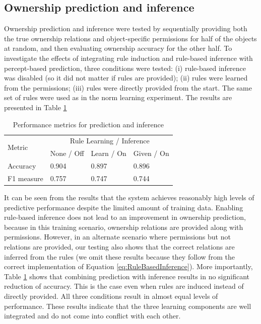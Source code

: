 \documentclass[letterpaper]{article} %
\begin{document}
\subsection{Ownership prediction and inference}

Ownership prediction and inference were tested by sequentially providing both the true ownership relations and object-specific permissions for half of the objects at random, and then evaluating ownership accuracy for the other half. To investigate the effects of integrating rule induction and rule-based inference with percept-based prediction, three conditions were tested: (i) rule-based inference was disabled (so it did not matter if rules are provided); (ii) rules were learned from the permissions; (iii) rules were directly provided from the start. The same set of rules were used as in the norm learning experiment. The results are presented in Table \ref{tab:OwnershipPrediction}

\begin{table}[ht]
\centering
\begin{tabular}{@{}llll@{}}
\toprule
\multirow{2}{*}{Metric} & \multicolumn{3}{c}{Rule Learning / Inference} \\ \cmidrule(l){2-4}
                        & None / Off  & Learn / On & Given / On \\ \midrule
Accuracy                & 0.904       & 0.897      & 0.896      \\
F1 measure              & 0.757       & 0.747      & 0.744      \\ \bottomrule
\end{tabular}
\caption{Performance metrics for prediction and inference}
\label{tab:OwnershipPrediction}
\end{table}

It can be seen from the results that the system achieves reasonably high levels of predictive performance despite the limited amount of training data. Enabling rule-based inference does not lead to an improvement in ownership prediction, because in this training scenario, ownership relations are provided along with permissions. However, in an alternate scenario where permissions but not relations are provided, our testing also shows that the correct relations are inferred from the rules (we omit these results because they follow from the correct implementation of Equation \ref{eq:RuleBasedInference}). More importantly, Table \ref{tab:OwnershipPrediction} shows that combining prediction with inference results in no significant reduction of accuracy. This is the case even when rules are induced instead of directly provided. All three conditions result in almost equal levels of performance. These results indicate that the three learning components are well integrated and do not come into conflict with each other.
\end{document}
